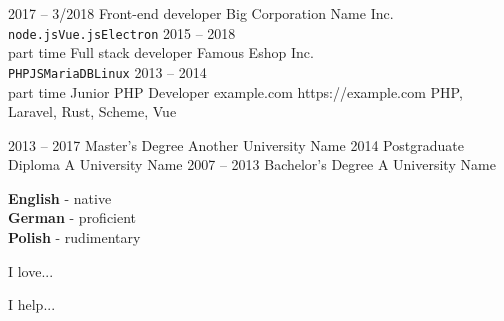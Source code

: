 \documentclass[9pt]{../template/developercv}
\begin{document}

\begin{entrylist}
    \entry
        {2017 -- 3/2018}
        {Front-end developer}
        {Big Corporation Name Inc.}
        {}
        {}
        {\lorem \lorem \lorem\\ \texttt{node.js}\slashsep\texttt{Vue.js}\slashsep\texttt{Electron}}
    \entry
        {2015 -- 2018\\\footnotesize{part time}}
        {Full stack developer}
        {Famous Eshop Inc.}
        {}
        {}
        {\lorem\lorem\\ \texttt{PHP}\slashsep\texttt{JS}\slashsep\texttt{MariaDB}\slashsep\texttt{Linux}}
    \entry
        {2013 -- 2014\\{\footnotesize part time }}
        {Junior PHP Developer}
        {example.com}
        {https://example.com}
        {PHP, Laravel, Rust, Scheme, Vue}
        {\entryitems{\lorem, \lorem}}
\end{entrylist}



\begin{entrylist}
    \entry
        {2013 -- 2017}
        {Master's Degree}
        {Another University Name}
        {}
        {}
        {\lorem\lorem\lorem}
    \entry
        {2014}
        {Postgraduate Diploma}
        {A University Name}
        {}
        {}
        {\lorem\lorem}
    \entry
        {2007 -- 2013}
        {Bachelor's Degree}
        {A University Name}
        {}
        {}
        {\lorem\lorem}
\end{entrylist}


\begin{minipage}[t]{0.3\textwidth}
    \vspace{-\baselineskip}
    \textbf{English} - native\\
    \textbf{German} - proficient\\
    \textbf{Polish} - rudimentary
\end{minipage}
%
\hfill
\begin{minipage}[t]{0.3\textwidth}
    \vspace{-\baselineskip}
    I love... \lorem
\end{minipage}
%
\hfill
\begin{minipage}[t]{0.3\textwidth}
    \vspace{-\baselineskip}
    I help... \lorem
\end{minipage}
\end{document}
